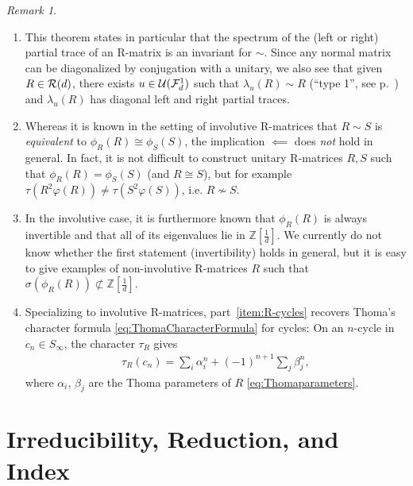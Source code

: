 \documentclass[12pt,a4paper]{amsart}
\numberwithin{equation}{section}
\theoremstyle{remark}
\newtheorem{remark}[theorem]{Remark}
\newcommand{\Zl}{\mathbb{Z}}
\newcommand{\la}{\lambda}
\newcommand{\CU}[0]{\mathcal{U}} \newcommand{\CV}[0]{\mathcal{V}}
\begin{document}
\begin{remark}\leavevmode
	\begin{enumerate}
	 \item This theorem states in particular that the spectrum of the (left or right) partial trace of an R-matrix is an invariant for $\sim$. Since any normal matrix can be diagonalized by conjugation with a unitary, we also see that given $R\in\mathcal{R}(d)$, there exists $u\in\CU(\CF_d^1)$ such that $\la_u(R)\sim R$ (``type 1'', see p.~\pageref{page:types}) and $\la_u(R)$ has diagonal left and right partial traces.
	 \item 	Whereas it is known in the setting of involutive R-matrices that $R\sim S$ is {\em equivalent} to $\phi_R(R)\cong\phi_S(S)$, the implication $\impliedby$ does {\em not} hold in general. In fact, it is not difficult to construct unitary R-matrices $R,S$ such that $\phi_R(R)=\phi_S(S)$ (and $R\cong S$), but for example $\tau(R^2\varphi(R))\neq\tau(S^2\varphi(S))$, i.e. $R\not\sim S$.
	 \item In the involutive case, it is furthermore known that $\phi_R(R)$ is always invertible and that all of its eigenvalues lie in $\Zl[\frac{1}{d}]$. We currently do not know whether the first statement (invertibility) holds in general, but it is easy to give examples of non-involutive R-matrices $R$ such that $\sigma(\phi_R(R))\not\subset\Zl[\frac{1}{d}]$.
	 \item Specializing to involutive R-matrices, part~\ref{item:R-cycles} recovers Thoma's character formula \eqref{eq:ThomaCharacterFormula} for cycles: On an $n$-cycle in $c_n\in S_\infty$, the character $\tau_R$ gives
	 \begin{align}\label{eq:ThomaOnCycle}
		\tau_R(c_n)
		=
		\sum_i \alpha_i^n+(-1)^{n+1}\sum_j\beta_j^n,
	 \end{align}
	 where $\alpha_i$, $\beta_j$ are the Thoma parameters of $R$ \eqref{eq:Thomaparameters}.
	\end{enumerate}
\end{remark}


\section{Irreducibility, Reduction, and Index}\label{section:irreducibility}
\end{document}
